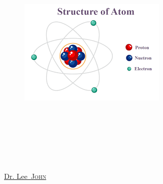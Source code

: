 \begin{titlepage}
\begin{center}

\vspace*{.06\textheight}
\vspace{1cm}
{\scshape\LARGE \univname\par} %
\vspace{0.8cm}

\begin{figure}[ht]
    \centering
    \includegraphics[width=\textwidth]{Figures/Theory/atom.png}
\end{figure}

\HRule \\[0.4cm] %
{\huge \bfseries \ttitle\par}\vspace{0.4cm} %
\HRule \\[1cm] %

\vspace{1cm}

\begin{minipage}[t]{0.4\textwidth}
\begin{flushleft} \large
{}\\
\href{https://orcid.org/my-orcid?orcid=0000-0000-0000-0000}{\authorname} %
\end{flushleft}
\end{minipage}
\begin{minipage}[t]{0.4\textwidth}
\begin{flushright} \large
{}\\
\href{https://www.researchgate.net/profile/Lee-John}{Dr. Lee~\textsc{John}}\\
\end{flushright}
\end{minipage}


\end{center}
\end{titlepage}
